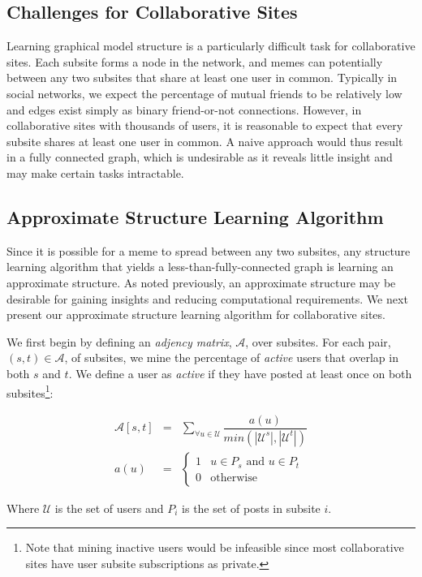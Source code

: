 \documentclass{article} %
\begin{document}
\subsection{Challenges for Collaborative Sites}
Learning graphical model structure is a particularly difficult task for collaborative sites. Each subsite forms a node in the network, and memes can potentially between any two subsites that share at least one user in common. Typically in social networks, we expect the percentage of mutual friends to be relatively low and edges exist simply as binary friend-or-not connections. However, in collaborative sites with thousands of users, it is reasonable to expect that every subsite shares at least one user in common. A naive approach would thus result in a fully connected graph, which is undesirable as it reveals little insight and may make certain tasks intractable.

\subsection{Approximate Structure Learning Algorithm}
Since it is possible for a meme to spread between any two subsites, any structure learning algorithm that yields a less-than-fully-connected graph is learning an approximate structure. As noted previously, an approximate structure may be desirable for gaining insights and reducing computational requirements. We next present our approximate structure learning algorithm for collaborative sites.

We first begin by defining an \textit{adjency matrix}, $\mathcal{A}$, over subsites. For each pair, $(s,t) \in \mathcal{A}$, of subsites, we mine the percentage of \textit{active} users that overlap in both $s$ and $t$. We define a user as \textit{active} if they have posted at least once on both subsites\footnote{Note that mining inactive users would be infeasible since most collaborative sites have user subsite subscriptions as private.}:

$$
\begin{array}{lll}
\mathcal{A}[s,t] &=& \sum_{\forall u \in \mathcal{U}}\dfrac{a(u)}{min(|\mathcal{U}^s|,|\mathcal{U}^t|)}\\
a(u) &=& \begin{cases}1&u \in P_s\text{ and }u \in P_t\\0 &\text{otherwise}\end{cases}
\end{array}
$$

Where $\mathcal{U}$ is the set of users and $P_i$ is the set of posts in subsite $i$.
\end{document}
